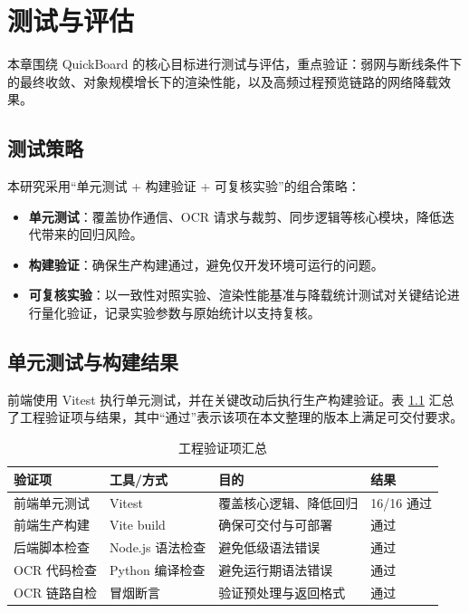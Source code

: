 \chapter{测试与评估}\label{chap:eval}

本章围绕 QuickBoard 的核心目标进行测试与评估，重点验证：弱网与断线条件下的最终收敛、对象规模增长下的渲染性能，以及高频过程预览链路的网络降载效果。

\section{测试策略}
本研究采用“单元测试 + 构建验证 + 可复核实验”的组合策略：
\begin{itemize}
  \item \textbf{单元测试}：覆盖协作通信、OCR 请求与裁剪、同步逻辑等核心模块，降低迭代带来的回归风险。
  \item \textbf{构建验证}：确保生产构建通过，避免仅开发环境可运行的问题。
  \item \textbf{可复核实验}：以一致性对照实验、渲染性能基准与降载统计测试对关键结论进行量化验证，记录实验参数与原始统计以支持复核。
\end{itemize}

\section{单元测试与构建结果}
前端使用 Vitest 执行单元测试，并在关键改动后执行生产构建验证。表 \ref{tab:verification} 汇总了工程验证项与结果，其中“通过”表示该项在本文整理的版本上满足可交付要求。

\begin{table}[htbp]
  \centering
  \caption{工程验证项汇总}\label{tab:verification}
  \renewcommand{\arraystretch}{1.35}
  \begin{tabular}{llll}
    \toprule
    \textbf{验证项} & \textbf{工具/方式} & \textbf{目的} & \textbf{结果} \\
    \midrule
    前端单元测试 & Vitest & 覆盖核心逻辑、降低回归 & 16/16 通过 \\
    前端生产构建 & Vite build & 确保可交付与可部署 & 通过 \\
    后端脚本检查 & Node.js 语法检查 & 避免低级语法错误 & 通过 \\
    OCR 代码检查 & Python 编译检查 & 避免运行期语法错误 & 通过 \\
    OCR 链路自检 & 冒烟断言 & 验证预处理与返回格式 & 通过 \\
    \bottomrule
  \end{tabular}
\end{table}


